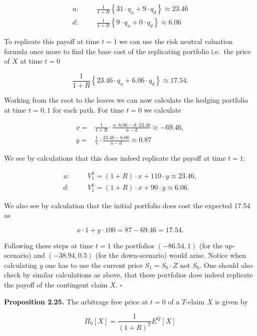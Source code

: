 \documentclass[
]{article}
\begin{document}
\begin{align*}
u:\hspace{20pt}&\frac{1}{1+R}\left\{31\cdot q_u + 9 \cdot q_d\right\}\approx 23.46\\
d:\hspace{20pt}&\frac{1}{1+R}\left\{9\cdot q_u + 0 \cdot q_d\right\}\approx 6.06
\end{align*}

To replicate this payoff at time \(t=1\) we can use the risk neutral
valuation formula once more to find the base cost of the replicating
portfolio i.e.~the price of \(X\) at time \(t=0\)

\[
\frac{1}{1+R}\left\{23.46\cdot q_u + 6.06 \cdot q_d\right\}\approx 17.54.
\]

Working from the root to the leaves we can now calculate the hedging
portfolio at time \(t=0,1\) for each path. For time \(t=0\) we calculate

\begin{align*}
x=&\frac{1}{1+R}\cdot \frac{u\cdot 6.06-d\cdot 23.46}{u-d}\approx -69.46,\\
y=&\frac{1}{s}\cdot\frac{23.46-6.06}{u-d}\approx0.87
\end{align*}

We see by calculations that this does indeed replicate the payoff at
time \(t=1\):

\begin{align*}
u:\hspace{20pt}&V_1^h=(1+R)\cdot x + 110\cdot y\approx 23.46,\\
d:\hspace{20pt}&V_1^h=(1+R)\cdot x + 90\cdot y\approx 6.06.
\end{align*}

We also see by calculation that the initial portfolio does cost the
expected 17.54 as

\[
x\cdot 1+y\cdot100=87-69.46=17.54.
\]

Following these steps at time \(t=1\) the portfolios \((-86.54,1)\) (for
the up-scenario) and \((-38.94,0.5)\) (for the down-scenario) would
arise. Notice when calculating \(y\) one has to use the current price
\(S_1=S_0\cdot Z\) not \(S_0\). One should also check by similar
calculations as above, that these portfolios does indeed replicate the
payoff of the contingent claim \(X\). \(\square\)

\textbf{Proposition 2.25.} The arbitrage free price at \(t=0\) of a
\(T\)-claim \(X\) is given by

\[
\Pi_0[X]=\frac{1}{(1+R)^T}E^Q[X]
\]
\end{document}
